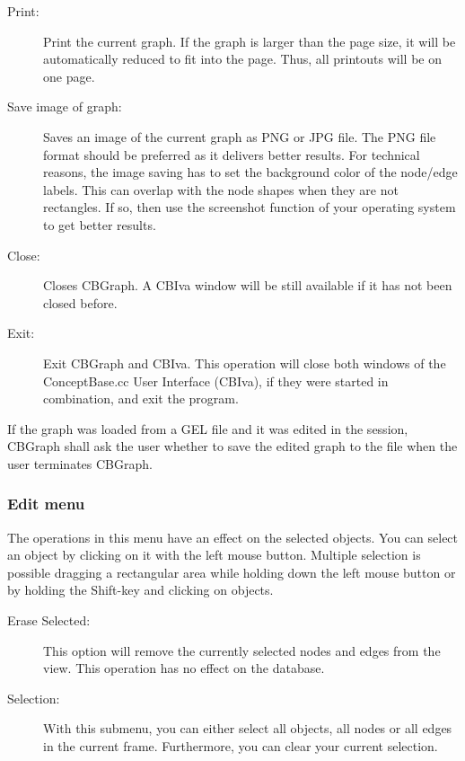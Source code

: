 \begin{description}
\item[Print:] Print the current graph. If the graph is larger than
the page size, it will be automatically reduced to fit into the page.
Thus, all printouts will be on one page.

\item[Save image of graph:] Saves an image of the current graph
as PNG or JPG file. The PNG file format should be preferred as it
delivers better results. For technical reasons, the image saving has
to set the background color of the node/edge labels. This can overlap
with the node shapes when they are not rectangles. If so, then use the
screenshot function of your operating system to get better results.

\item[Close:] Closes CBGraph. A CBIva window will be still available
if it has not been closed before.

\item[Exit:] Exit CBGraph and CBIva. This operation will close
both windows of the ConceptBase.cc User Interface (CBIva), if they were started
in combination, and exit the program.
\end{description}

If the graph was loaded from a GEL file and it was edited in the session,
CBGraph shall ask the user whether to save the edited graph to the file
when the user terminates CBGraph.



\subsubsection{Edit menu}

The operations in this menu have an effect on the selected objects.
You can select an object by clicking on it with the left mouse button.
Multiple selection is possible dragging a rectangular area while holding
down the left mouse button or by holding the Shift-key and clicking
on objects.

\begin{description}
\item[Erase Selected:] This option will remove the currently selected
nodes and edges from the view. This operation has no effect on the database.
\item[Selection:] With this submenu, you can either select all objects,
all nodes or all edges in the current frame. Furthermore, you can clear your
current selection.
\end{description}

